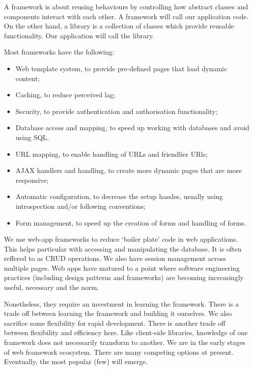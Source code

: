 \documentclass[a4paper, openany]{memoir}
\begin{document}
\noindent A framework is about reusing behaviours by controlling how abstract classes and components interact with each other. A framework will call our application code. On the other hand, a library is a collection of classes which provide reusable functionality. Our application will call the library.

\noindent Most frameworks have the following:
\begin{itemize}
    \item Web template system, to provide pre-defined pages that load dynamic content;
    \item Caching, to reduce perceived lag;
    \item Security, to provide authentication and authorisation functionality;
    \item Database access and mapping, to speed up working with databases and avoid using SQL.
    \item URL mapping, to enable handling of URLs and friendlier URls;
    \item AJAX handlers and handling, to create more dynamic pages that are more responsive;
    \item Automatic configuration, to decrease the setup hassles, usually using introspection and/or following conventions;
    \item Form management, to speed up the creation of forms and handling of forms.
\end{itemize}
We use web-app frameworks to reduce `boiler plate' code in web applications. This helps particular with accessing and manipulating the database. It is often reffered to as CRUD operations. We also have session management across multiple pages. Web apps have matured to a point where software engineering practices (including design patterns and frameworks) are becoming increasingly useful, necessary and the norm.

\noindent Nonetheless, they require an investment in learning the framework. There is a trade off between learning the framework and building it ourselves. We also sacrifice some flexibility for rapid development. There is another trade off between flexibility and efficiency here. Like client-side libraries, knowledge of one framework does not necessarily transform to another. We are in the early stages of web framework ecosystem. There are many competing options at present. Eventually, the most popular (few) will emerge.
\end{document}
